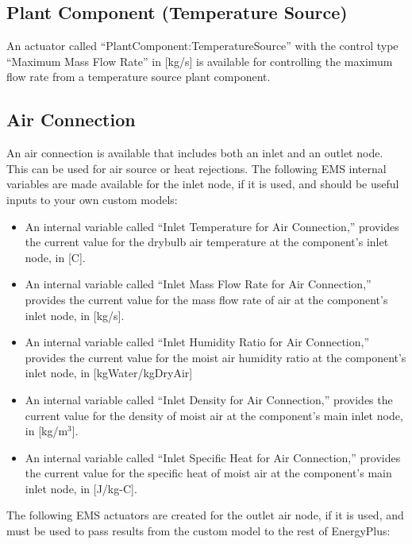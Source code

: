 \subsection{Plant Component (Temperature Source)}\label{plant-component-temperature-source}

An actuator called ``PlantComponent:TemperatureSource'' with the control type ``Maximum Mass Flow Rate'' in {[}kg/s{]} is available for controlling the maximum flow rate from a temperature source plant component.

\subsection{Air Connection}\label{air-connection}

An air connection is available that includes both an inlet and an outlet node.~ This can be used for air source or heat rejections. The following EMS internal variables are made available for the inlet node, if it is used, and should be useful inputs to your own custom models:

\begin{itemize}
\item
  An internal variable called ``Inlet Temperature for Air Connection,'' provides the current value for the drybulb air temperature at the component's inlet node, in {[}C{]}.
\item
  An internal variable called ``Inlet Mass Flow Rate for Air Connection,'' provides the current value for the mass flow rate of air at the component's inlet node, in {[}kg/s{]}.
\item
  An internal variable called ``Inlet Humidity Ratio for Air Connection,'' provides the current value for the moist air humidity ratio at the component's inlet node, in {[}kgWater/kgDryAir{]}
\item
  An internal variable called ``Inlet Density for Air Connection,'' provides the current value for the density of moist air at the component's main inlet node, in {[}kg/m\(^{3}\){]}.
\item
  An internal variable called ``Inlet Specific Heat for Air Connection,'' provides the current value for the specific heat of moist air at the component's main inlet node, in {[}J/kg-C{]}.
\end{itemize}

The following EMS actuators are created for the outlet air node, if it is used, and must be used to pass results from the custom model to the rest of EnergyPlus:

